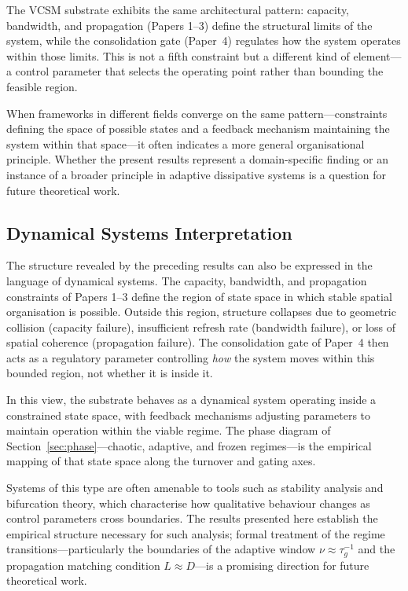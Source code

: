 \documentclass[11pt]{article}
\begin{document}
The VCSM substrate exhibits the same architectural pattern: capacity, bandwidth, and propagation (Papers 1--3) define the structural limits of the system, while the consolidation gate (Paper~4) regulates how the system operates within those limits. This is not a fifth constraint but a different kind of element---a control parameter that selects the operating point rather than bounding the feasible region.

When frameworks in different fields converge on the same pattern---constraints defining the space of possible states and a feedback mechanism maintaining the system within that space---it often indicates a more general organisational principle. Whether the present results represent a domain-specific finding or an instance of a broader principle in adaptive dissipative systems is a question for future theoretical work.

\subsection{Dynamical Systems Interpretation}
\label{sec:dyninterp}

The structure revealed by the preceding results can also be expressed in the language of dynamical systems. The capacity, bandwidth, and propagation constraints of Papers 1--3 define the region of state space in which stable spatial organisation is possible. Outside this region, structure collapses due to geometric collision (capacity failure), insufficient refresh rate (bandwidth failure), or loss of spatial coherence (propagation failure). The consolidation gate of Paper~4 then acts as a regulatory parameter controlling \emph{how} the system moves within this bounded region, not whether it is inside it.

In this view, the substrate behaves as a dynamical system operating inside a constrained state space, with feedback mechanisms adjusting parameters to maintain operation within the viable regime. The phase diagram of Section~\ref{sec:phase}---chaotic, adaptive, and frozen regimes---is the empirical mapping of that state space along the turnover and gating axes.

Systems of this type are often amenable to tools such as stability analysis and bifurcation theory, which characterise how qualitative behaviour changes as control parameters cross boundaries. The results presented here establish the empirical structure necessary for such analysis; formal treatment of the regime transitions---particularly the boundaries of the adaptive window $\nu \approx \tau_g^{-1}$ and the propagation matching condition $L \approx D$---is a promising direction for future theoretical work.
\end{document}
